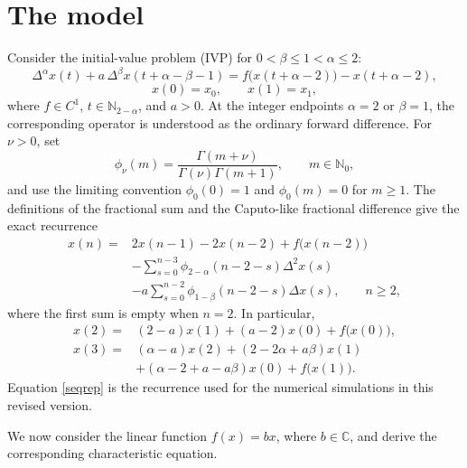 \documentclass[11pt,a4paper]{article}
\theoremstyle{definition}
\begin{document}
\section{The model} \label{1model}
Consider the initial-value problem (IVP) for $0 < \beta \leq 1 < \alpha \leq 2$:
\begin{equation} 
\Delta^{\alpha}x(t) + a\,\Delta^{\beta}x(t + \alpha - \beta - 1)
= f\bigl(x(t + \alpha - 2)\bigr) - x(t + \alpha - 2), \label{1}
\end{equation}
\begin{equation}
   x(0) = x_0, \qquad x(1) = x_1, \label{2}
\end{equation}
where $f \in C^1$, $t \in \mathbb{N}_{2-\alpha}$, and $a > 0$.
At the integer endpoints $\alpha=2$ or $\beta=1$, the corresponding operator is understood as the ordinary forward difference. For $\nu>0$, set
\begin{equation*}
\phi_\nu(m)=\frac{\Gamma(m+\nu)}{\Gamma(\nu)\Gamma(m+1)},
\qquad m\in\mathbb{N}_0,
\end{equation*}
and use the limiting convention $\phi_0(0)=1$ and $\phi_0(m)=0$ for $m\geq1$. The definitions of the fractional sum and the Caputo-like fractional difference give the exact recurrence
\begin{align}
x(n)={}&2x(n-1)-2x(n-2)+f\bigl(x(n-2)\bigr) \nonumber\\
&-\sum_{s=0}^{n-3}\phi_{2-\alpha}(n-2-s)\Delta^2x(s) \nonumber\\
&-a\sum_{s=0}^{n-2}\phi_{1-\beta}(n-2-s)\Delta x(s),
\qquad n\geq2, \label{seqrep}
\end{align}
where the first sum is empty when $n=2$. In particular,
\begin{align}
x(2)={}&(2-a)x(1)+(a-2)x(0)+f\bigl(x(0)\bigr), \\
x(3)={}&(\alpha-a)x(2)+(2-2\alpha+a\beta)x(1) \nonumber\\
&+(\alpha-2+a-a\beta)x(0)+f\bigl(x(1)\bigr).
\end{align}
Equation \eqref{seqrep} is the recurrence used for the numerical simulations in this revised version.
\par We now consider the linear function $f(x) = bx$, where $b \in \mathbb{C}$, and derive the corresponding characteristic equation.
\end{document}
